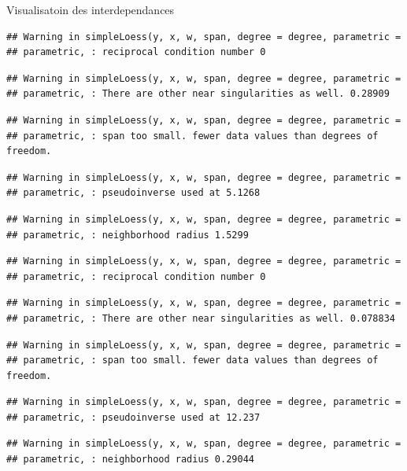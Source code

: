 \documentclass[11pt,ignorenonframetext,]{beamer}
\begin{document}
\begin{frame}[fragile]{Visualisatoin des interdependances}
\begin{verbatim}
## Warning in simpleLoess(y, x, w, span, degree = degree, parametric =
## parametric, : reciprocal condition number 0
\end{verbatim}

\begin{verbatim}
## Warning in simpleLoess(y, x, w, span, degree = degree, parametric =
## parametric, : There are other near singularities as well. 0.28909
\end{verbatim}

\begin{verbatim}
## Warning in simpleLoess(y, x, w, span, degree = degree, parametric =
## parametric, : span too small. fewer data values than degrees of freedom.
\end{verbatim}

\begin{verbatim}
## Warning in simpleLoess(y, x, w, span, degree = degree, parametric =
## parametric, : pseudoinverse used at 5.1268
\end{verbatim}

\begin{verbatim}
## Warning in simpleLoess(y, x, w, span, degree = degree, parametric =
## parametric, : neighborhood radius 1.5299
\end{verbatim}

\begin{verbatim}
## Warning in simpleLoess(y, x, w, span, degree = degree, parametric =
## parametric, : reciprocal condition number 0
\end{verbatim}

\begin{verbatim}
## Warning in simpleLoess(y, x, w, span, degree = degree, parametric =
## parametric, : There are other near singularities as well. 0.078834
\end{verbatim}

\begin{verbatim}
## Warning in simpleLoess(y, x, w, span, degree = degree, parametric =
## parametric, : span too small. fewer data values than degrees of freedom.
\end{verbatim}

\begin{verbatim}
## Warning in simpleLoess(y, x, w, span, degree = degree, parametric =
## parametric, : pseudoinverse used at 12.237
\end{verbatim}

\begin{verbatim}
## Warning in simpleLoess(y, x, w, span, degree = degree, parametric =
## parametric, : neighborhood radius 0.29044
\end{verbatim}


\end{frame}
\end{document}
